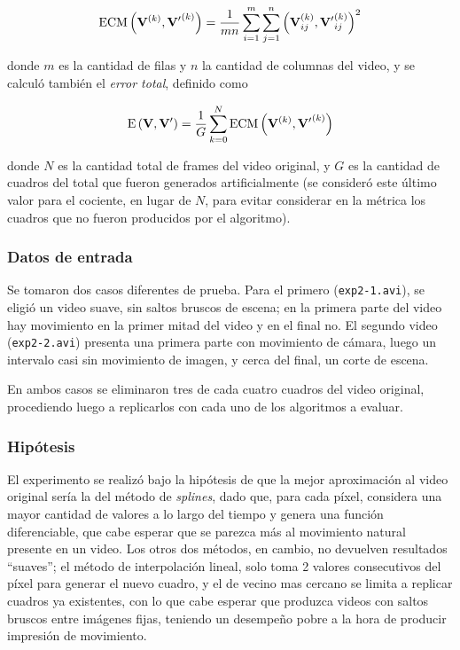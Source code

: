             \[ \text{ECM} \left( \mathbf{V}^{(k)}, \mathbf{V'}^{(k)} \right) = \frac{1}{mn} \sum_{i=1}^m\sum_{j = 1}^n \left( \mathbf{V}^{(k)}_{ij}, \mathbf{V'}^{(k)}_{ij} \right)^2 \]

            donde $m$ es la cantidad de filas y $n$ la cantidad de columnas del video, y se calculó también el \emph{error total}, definido como

            \[ \text{E} \left( \mathbf{V}, \mathbf{V'} \right) = \frac{1}{G} \sum_{k=0}^N \text{ECM} \left( \mathbf{V}^{(k)}, \mathbf{V'}^{(k)} \right) \]

            donde $N$ es la cantidad total de frames del video original, y $G$ es la cantidad de cuadros del total que fueron generados artificialmente (se consideró este último valor para el cociente, en lugar de $N$, para evitar considerar en la métrica los cuadros que no fueron producidos por el algoritmo).

        \subsubsection*{Datos de entrada}

            Se tomaron dos casos diferentes de prueba. Para el primero (\texttt{exp2-1.avi}), se eligió un video suave, sin saltos bruscos de escena; en la primera parte del video hay movimiento en la primer mitad del video y en el final no. El segundo video (\texttt{exp2-2.avi}) presenta una primera parte con movimiento de cámara, luego un intervalo casi sin movimiento de imagen, y cerca del final, un corte de escena.

            En ambos casos se eliminaron tres de cada cuatro cuadros del video original, procediendo luego a replicarlos con cada uno de los algoritmos a evaluar.

        \subsubsection*{Hipótesis}

            El experimento se realizó bajo la hipótesis de que la mejor aproximación al video original sería la del método de \emph{splines}, dado que, para cada píxel, considera una mayor cantidad de valores a lo largo del tiempo y genera una función diferenciable, que cabe esperar que se parezca más al movimiento natural presente en un video. Los otros dos métodos, en cambio, no devuelven resultados ``suaves''; el método de interpolación lineal, solo toma 2 valores consecutivos del píxel para generar el nuevo cuadro, y el de vecino mas cercano se limita a replicar cuadros ya existentes, con lo que cabe esperar que produzca videos con saltos bruscos entre imágenes fijas, teniendo un desempeño pobre a la hora de producir impresión de movimiento.

